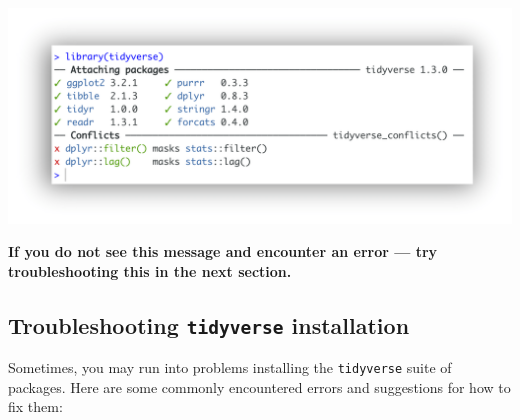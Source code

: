 \documentclass[
]{book}
\begin{document}
\begin{enumerate}
\begin{alert}
  \end{alert}

  \includegraphics{R/Rinstall/images/tidyverse_install.png}

  \begin{alert}

  \textbf{If you do not see this message and encounter an error --- try troubleshooting this in the next section.}

  \end{alert}
\end{enumerate}

\hypertarget{troubleshooting-tidyverse-installation}{%
\subsection{\texorpdfstring{Troubleshooting \texttt{tidyverse} installation}{Troubleshooting tidyverse installation}}\label{troubleshooting-tidyverse-installation}}

Sometimes, you may run into problems installing the \texttt{tidyverse} suite of packages. Here are some commonly encountered errors and suggestions for how to fix them:
\end{document}

